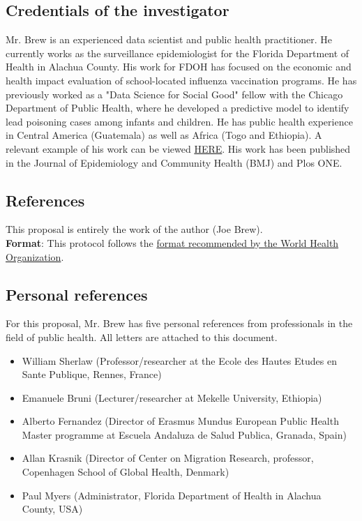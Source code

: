 \documentclass{article}
\begin{document}
\begin{multicols}{2}
\subsection*{Credentials of the investigator}

Mr. Brew is an experienced data scientist and public health practitioner.  He currently works as the surveillance epidemiologist for the Florida Department of Health in Alachua County.  His work for FDOH has focused on the economic and health impact evaluation of school-located influenza vaccination programs.  He has previously worked as a "Data Science for Social Good" fellow with the Chicago Department of Public Health, where he developed a predictive model to identify lead poisoning cases among infants and children. He has public health experience in Central America (Guatemala) as well as Africa (Togo and Ethiopia).  A relevant example of his work can be viewed \href{https://joebrew.shinyapps.io/sliv}{HERE}. His work has been published in the Journal of Epidemiology and Community Health (BMJ) and Plos ONE.


\subsection*{References}
This proposal is entirely the work of the author (Joe Brew).  \\

\noindent \textbf{Format}: This protocol follows the \href{http://www.who.int/rpc/research_ethics/format_rp/en/}{format recommended by the World Health Organization}. \\

\subsection*{Personal references} 
For this proposal, Mr. Brew has five personal references from professionals in the field of public health.  All letters are attached to this document. \begin{itemize}
\item William Sherlaw (Professor/researcher at the Ecole des Hautes Etudes en Sante Publique, Rennes, France)
\item Emanuele Bruni (Lecturer/researcher at Mekelle University, Ethiopia)
\item Alberto Fernandez (Director of Erasmus Mundus European Public Health Master programme at Escuela Andaluza de Salud Publica, Granada, Spain)
\item Allan Krasnik (Director of Center on Migration Research, professor, Copenhagen School of Global Health, Denmark)
\item Paul Myers (Administrator, Florida Department of Health in Alachua County, USA)
\end{itemize}


\end{multicols}
\end{document}
